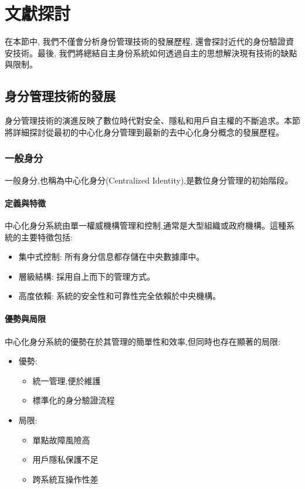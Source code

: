 
\chapter{文獻探討}

在本節中, 我們不僅會分析身份管理技術的發展歷程, 還會探討近代的身份驗證資安技術。最後, 我們將總結自主身份系統如何透過自主的思想解決現有技術的缺點與限制。

\section{身分管理技術的發展}
身分管理技術的演進反映了數位時代對安全、隱私和用戶自主權的不斷追求。本節將詳細探討從最初的中心化身分管理到最新的去中心化身分概念的發展歷程。
\subsection{一般身分}
一般身分,也稱為中心化身分(Centralized Identity),是數位身分管理的初始階段。
\subsubsection{定義與特徵}
中心化身分系統由單一權威機構管理和控制,通常是大型組織或政府機構。這種系統的主要特徵包括:
\begin{itemize}
  \item 集中式控制: 所有身分信息都存儲在中央數據庫中。
  \item 層級結構: 採用自上而下的管理方式。
  \item 高度依賴: 系統的安全性和可靠性完全依賴於中央機構。
\end{itemize}
\subsubsection{優勢與局限}
中心化身分系統的優勢在於其管理的簡單性和效率,但同時也存在顯著的局限:
\begin{itemize}
  \item 優勢:
        \begin{itemize}
          \item 統一管理,便於維護
          \item 標準化的身分驗證流程
        \end{itemize}
  \item 局限:
        \begin{itemize}
          \item 單點故障風險高
          \item 用戶隱私保護不足
          \item 跨系統互操作性差
        \end{itemize}
\end{itemize}
